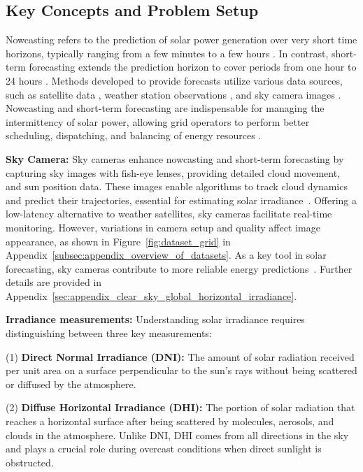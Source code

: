 \subsection{Key Concepts and Problem Setup}

Nowcasting refers to the prediction of solar power generation over very short time horizons, typically ranging from a few minutes to a few hours \cite{nowcasting_defn}. In contrast, short-term forecasting extends the prediction horizon to cover periods from one hour to 24 hours \cite{forecasting_defn}. Methods developed to provide forecasts utilize various data sources, such as satellite data \cite{nowcasting_satellite, nowcasting_defn}, weather station observations \cite{nowcasting_defn}, and sky camera images \cite{wacv2022, nwp_and_tsi, talha2019}. Nowcasting and short-term forecasting are indispensable for managing the intermittency of solar power, allowing grid operators to perform better scheduling, dispatching, and balancing of energy resources \cite{dairi2020short, aouidad2024machine}.

\textbf{Sky Camera:} 
Sky cameras enhance nowcasting and short-term forecasting by capturing sky images with fish-eye lenses, providing detailed cloud movement, and sun position data. These images enable algorithms to track cloud dynamics and predict their trajectories, essential for estimating solar irradiance~\cite{saraswat2023sky, dev2019estimating}. Offering a low-latency alternative to weather satellites, sky cameras facilitate real-time monitoring. However, variations in camera setup and quality affect image appearance, as shown in Figure~\ref{fig:dataset_grid} in Appendix~\ref{subsec:appendix_overview_of_datasets}. As a key tool in solar forecasting, sky cameras contribute to more reliable energy predictions~\cite{rajagukguk2021deep}. Further details are provided in Appendix~\ref{sec:appendix_clear_sky_global_horizontal_irradiance}.


\textbf{Irradiance measurements:} Understanding solar irradiance requires distinguishing between three key measurements:

(1) \textbf{Direct Normal Irradiance (DNI):} The amount of solar radiation received per unit area on a  surface perpendicular to the sun’s rays without being scattered or diffused by the atmosphere.

(2) \textbf{Diffuse Horizontal Irradiance (DHI):} The portion of solar radiation that reaches a horizontal surface after being scattered by molecules, aerosols, and clouds in the atmosphere. Unlike DNI, DHI comes from all directions in the sky and plays a crucial role during overcast conditions when direct sunlight is obstructed.

